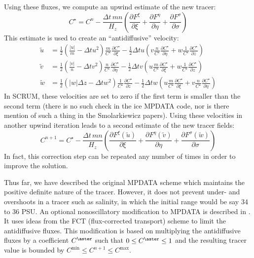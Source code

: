 Using these fluxes, we compute an upwind estimate of the new
tracer:
\begin{equation}
   C^{\star} = C^n - \frac{\Delta t\, mn}{H_z} \left(
   \frac{\partial F^\xi}{\partial \xi} +
   \frac{\partial F^\eta}{\partial \eta} +
   \frac{\partial F^\sigma}{\partial \sigma} \right)
\end{equation}
This estimate is used to create an ``antidiffusive'' velocity:
\begin{align}
   \tilde{u} &= \frac{1}{2}
      \left( \frac{|u|}{m} - \Delta t u^2 \right)
      \frac{m}{C^\star} \frac{\partial C^\star}{\partial \xi} -
      \frac{1}{2} \Delta t u \left( v \frac{n}{C^\star} 
      \frac{\partial C^\star}{\partial \eta} +
      w \frac{1}{C^\star} \frac{\partial C^\star}{\partial z}
      \right) \label{antiu} \\
   \tilde{v} &= \frac{1}{2}
      \left( \frac{|v|}{n} - \Delta t v^2 \right)
      \frac{n}{C^\star} \frac{\partial C^\star}{\partial \eta} -
      \frac{1}{2} \Delta t v \left( u \frac{m}{C^\star} 
      \frac{\partial C^\star}{\partial \xi} +
      w \frac{1}{C^\star} \frac{\partial C^\star}{\partial z}
      \right) \label{antiv} \\
   \tilde{w} &= \frac{1}{2}
      \left( |w| \Delta z - \Delta t w^2 \right)
      \frac{1}{C^\star} \frac{\partial C^\star}{\partial z} -
      \frac{1}{2} \Delta t w \left( u \frac{m}{C^\star} 
      \frac{\partial C^\star}{\partial \xi} +
      v \frac{n}{C^\star} \frac{\partial C^\star}{\partial \eta}
      \right) \label{antiw}
\end{align}
In SCRUM, these velocities are set to zero if the first term is smaller
than the second term (there is no such check in the ice MPDATA code,
nor is there mention of such a thing in the Smolarkiewicz papers).
Using these velocities in another upwind iteration leads to a second
estimate of the new tracer fields:
\begin{equation}
   C^{n+1} = C^\star - \frac{\Delta t\, mn}{H_z} \left(
   \frac{\partial F^\xi(\tilde{u})}{\partial \xi} +
   \frac{\partial F^\eta(\tilde{v})}{\partial \eta} +
   \frac{\partial F^\sigma(\tilde{w})}{\partial \sigma} \right)
\label{antidiff}
\end{equation}
In fact, this correction step can be repeated any number of times in
order to improve the solution.

Thus far, we have described the original MPDATA scheme which
maintains the positive definite nature of the tracer.  However, it does
not prevent under- and overshoots in a tracer such as salinity, in which
the initial range would be say 34 to 36 PSU. An optional nonoscillatory
modification to MPDATA is described in \citet{Smolark90}.
It uses ideas from the FCT (flux-corrected transport) scheme to limit
the antidiffusive fluxes. This modification is based on multiplying the
antidiffusive fluxes by a coefficient $C^\aster$ such that $0 \leq
C^\aster \leq 1$
and the resulting tracer value is bounded by $C^{\min} \leq
C^{n+1} \leq C^{\max}$.
  
